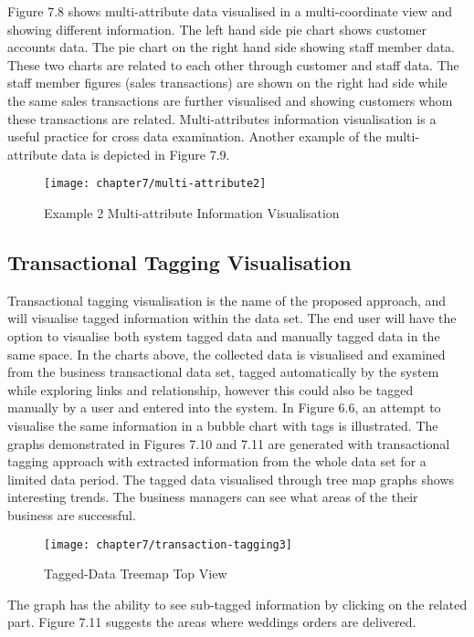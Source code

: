Figure 7.8 shows multi-attribute data visualised in a multi-coordinate view and showing different information. The left hand side pie chart shows customer accounts data. The pie chart on the right hand side showing staff member data. These two charts are related to each other through customer and staff data. The staff member figures (sales transactions) are shown on the right had side while the same sales transactions are further visualised and showing customers whom these transactions are related.  Multi-attributes information visualisation is a useful practice for cross data examination. Another example of the multi-attribute data is depicted in Figure 7.9.

\begin{figure}[H]
\centering
\texttt{[image: chapter7/multi-attribute2]}
\caption{ Example 2 Multi-attribute Information Visualisation}
\end{figure}

\subsection{Transactional Tagging Visualisation}

Transactional tagging visualisation is the name of the proposed approach, and will visualise tagged information within the data set. The end user will have the option to visualise both system tagged data and manually tagged data in the same space. In the charts above, the collected data is visualised and examined from the business transactional data set, tagged automatically by the system while exploring links and relationship, however this could also be tagged manually by a user and entered into the system. In Figure 6.6, an attempt to visualise the same information in a bubble chart with tags is illustrated. The graphs demonstrated in Figures 7.10 and 7.11 are generated with transactional tagging approach with extracted information from the whole data set for a limited data period. The tagged data visualised through tree map graphs shows interesting trends. The business managers can see what areas of the their business are successful.

\begin{figure}[H]
\centering
\texttt{[image: chapter7/transaction-tagging3]}
\caption{ Tagged-Data Treemap Top View}
\end{figure}

The graph has the ability to see sub-tagged information by clicking on the related part. Figure 7.11 suggests the areas where weddings orders are delivered.


